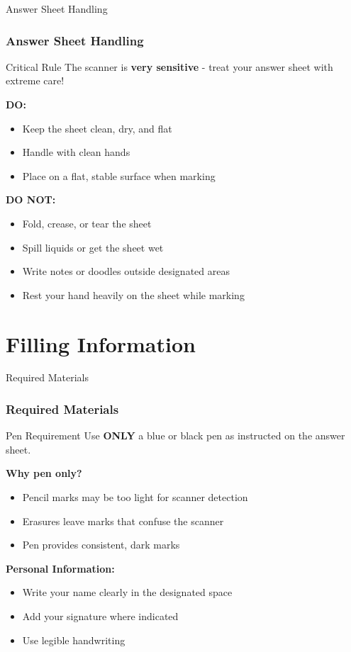 \documentclass{beamer}
\begin{document}
\begin{frame}{Answer Sheet Handling}
\frametitle{Answer Sheet Handling}
\begin{block}{Critical Rule}
The scanner is \textbf{very sensitive} - treat your answer sheet with extreme care!
\end{block}

\textbf{DO:}
\begin{itemize}
\item Keep the sheet clean, dry, and flat
\item Handle with clean hands
\item Place on a flat, stable surface when marking
\end{itemize}

\textbf{DO NOT:}
\begin{itemize}
\item Fold, crease, or tear the sheet
\item Spill liquids or get the sheet wet
\item Write notes or doodles outside designated areas
\item Rest your hand heavily on the sheet while marking
\end{itemize}
\end{frame}

\section{Filling Information}

\begin{frame}{Required Materials}
\frametitle{Required Materials}
\begin{block}{Pen Requirement}
Use \textbf{ONLY} a blue or black pen as instructed on the answer sheet.
\end{block}

\textbf{Why pen only?}
\begin{itemize}
\item Pencil marks may be too light for scanner detection
\item Erasures leave marks that confuse the scanner
\item Pen provides consistent, dark marks
\end{itemize}

\textbf{Personal Information:}
\begin{itemize}
\item Write your name clearly in the designated space
\item Add your signature where indicated
\item Use legible handwriting
\end{itemize}
\end{frame}
\end{document}
